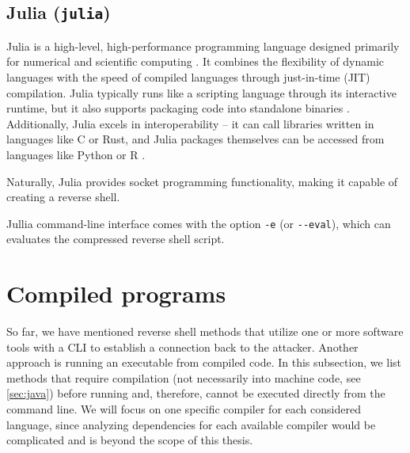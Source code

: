 

\subsection{Julia (\texttt{julia})}


Julia is a high-level, high-performance programming language designed primarily for numerical and scientific computing \cite{julia-intro}. It combines the flexibility of dynamic languages with the speed of compiled languages through just-in-time (JIT) compilation. Julia typically runs like a scripting language through its interactive runtime, but it also supports packaging code into standalone binaries \cite{julia-compiler}. Additionally, Julia excels in interoperability -- it can call libraries written in languages like C or Rust, and Julia packages themselves can be accessed from languages like Python or R \cite{julia-calling-c}.

Naturally, Julia provides socket programming functionality, making it capable of creating a reverse shell.



Jullia command-line interface comes with the option \texttt{-e} (or \texttt{-{}-eval}), which can evaluates the compressed reverse shell script.



\section{Compiled programs}
\label{sec:program-compilers}

So far, we have mentioned reverse shell methods that utilize one or more software tools with a CLI to establish a connection back to the attacker. Another approach is running an executable from compiled code. In this subsection, we list methods that require compilation (not necessarily into machine code, see \cref{sec:java}) before running and, therefore, cannot be executed directly from the command line. We will focus on one specific compiler for each considered language, since analyzing dependencies for each available compiler would be complicated and is beyond the scope of this thesis.

